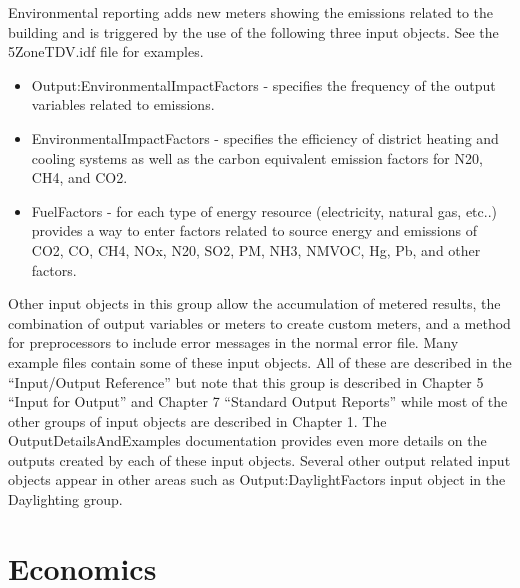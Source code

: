 Environmental reporting adds new meters showing the emissions related
to the building and is triggered by the use of the following three
input objects. See the 5ZoneTDV.idf file for examples.
\begin{itemize}
\item Output:EnvironmentalImpactFactors - specifies the frequency of the
output variables related to emissions.
\item EnvironmentalImpactFactors - specifies the efficiency of district
heating and cooling systems as well as the carbon equivalent emission
factors for N20, CH4, and CO2.
\item FuelFactors - for each type of energy resource (electricity, natural
gas, etc..) provides a way to enter factors related to source energy
and emissions of CO2, CO, CH4, NOx, N20, SO2, PM, NH3, NMVOC, Hg,
Pb, and other factors.
\end{itemize}
Other input objects in this group allow the accumulation of metered
results, the combination of output variables or meters to create custom
meters, and a method for preprocessors to include error messages in
the normal error file. Many example files contain some of these input
objects. All of these are described in the \textquotedblleft Input/Output
Reference\textquotedblright{} but note that this group is described
in Chapter 5 ``Input for Output'' and Chapter 7 ``Standard Output
Reports'' while most of the other groups of input objects are described
in Chapter 1. The OutputDetailsAndExamples documentation provides
even more details on the outputs created by each of these input objects.
Several other output related input objects appear in other areas such
as Output:DaylightFactors input object in the Daylighting group.

\section{Economics}

